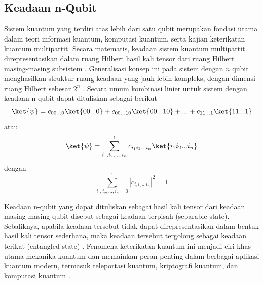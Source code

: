 \subsection{Keadaan n-Qubit}
\par
Sistem kuantum yang terdiri atas lebih dari satu qubit merupakan fondasi utama dalam teori informasi kuantum, komputasi kuantum, serta kajian keterikatan kuantum multipartit. Secara matematis, keadaan sistem kuantum multipartit direpresentasikan dalam ruang Hilbert hasil kali tensor dari ruang Hilbert masing-masing subsistem \cite{nielsen2010quantum}. Generalisasi konsep ini pada sistem dengan $n$ qubit menghasilkan struktur ruang keadaan yang jauh lebih kompleks, dengan dimensi ruang Hilbert sebesar $2^n$ \cite{preskill_lecture_notes}. Secara umum kombinasi linier untuk sistem dengan keadaan n qubit dapat dituliskan sebagai berikut
\begin{equation}
	\ket{\psi}=c_{00...0}\ket{00...0}+c_{00...10}\ket{00...10}+...+c_{11...1}\ket{11...1}
\end{equation}
atau
\begin{equation}
	\ket{\psi}=\sum_{i_1,i_2,...,i_n}^1 c_{i_1 i_2...i_n}\ket{i_1 i_2...i_n}
\end{equation}
dengan
\begin{equation}
	\sum_{i_1,i_2,...,i_n=0}^{1}|c_{i_1 i_2...i_n}|^2=1
\end{equation}

Keadaan n-qubit yang dapat dituliskan sebagai hasil kali tensor dari keadaan masing-masing qubit disebut sebagai keadaan terpisah (separable state). Sebaliknya, apabila keadaan tersebut tidak dapat direpresentasikan dalam bentuk hasil kali tensor sederhana, maka keadaan tersebut tergolong sebagai keadaan terikat (entangled state) \cite{horodecki2009quantum}. Fenomena keterikatan kuantum ini menjadi ciri khas utama mekanika kuantum dan memainkan peran penting dalam berbagai aplikasi kuantum modern, termasuk teleportasi kuantum, kriptografi kuantum, dan komputasi kuantum \cite{bennett_1993}.

